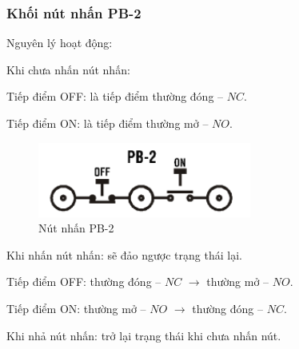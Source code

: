 \documentclass[13pt,a4paper]{extarticle}
\begin{document}
\subsubsection{Khối nút nhấn PB-2}
Nguyên lý hoạt động:
\begin{list}{--}{}
\item Khi chưa nhấn nút nhấn:
\begin{list}{+}{}
\item Tiếp điểm OFF: là tiếp điểm thường đóng -- $NC$.
\item Tiếp điểm ON: là tiếp điểm thường mở -- $NO$.
\end{list}
\begin{figure}[!h]
\begin{center}
\includegraphics[scale=.7]{nut-nhan-2}
\end{center}
\caption{Nút nhấn PB-2}
\end{figure}
\item Khi nhấn nút nhấn: sẽ đảo ngược trạng thái lại.
\begin{list}{+}{}
\item Tiếp điểm OFF: thường đóng -- $NC$ $\longrightarrow$ thường mở -- $NO$.
\item Tiếp điểm ON: thường mở -- $NO$ $\longrightarrow$ thường đóng -- $NC$.
\end{list}
\item Khi nhả nút nhấn: trở lại trạng thái khi chưa nhấn nút.
\end{list}
\end{document}
